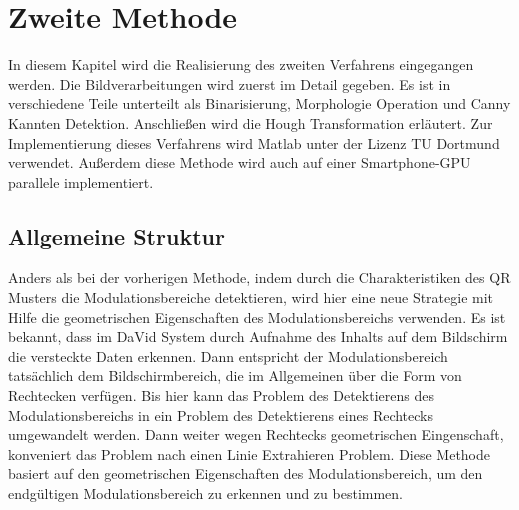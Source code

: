 \chapter{Zweite Methode} \label{cha:ZweiteMethode}

In diesem Kapitel wird die Realisierung des zweiten Verfahrens eingegangen werden. Die Bildverarbeitungen wird zuerst im Detail gegeben. Es ist in verschiedene Teile unterteilt als Binarisierung, Morphologie Operation und Canny Kannten Detektion. Anschließen wird die Hough Transformation erläutert. Zur Implementierung dieses Verfahrens wird Matlab unter der Lizenz TU Dortmund verwendet. Außerdem diese Methode wird auch auf einer Smartphone-GPU parallele implementiert.

\section{Allgemeine Struktur} 

Anders als bei der vorherigen Methode, indem durch die  Charakteristiken des QR Musters die Modulationsbereiche detektieren, wird hier eine neue Strategie mit Hilfe die geometrischen Eigenschaften des Modulationsbereichs verwenden. 
Es ist bekannt, dass im DaVid System durch Aufnahme des Inhalts auf dem Bildschirm die versteckte Daten erkennen. Dann entspricht der Modulationsbereich tatsächlich dem Bildschirmbereich, die im Allgemeinen über die Form von Rechtecken verfügen. Bis hier kann das Problem des Detektierens des Modulationsbereichs in ein Problem des Detektierens eines Rechtecks umgewandelt werden. Dann weiter wegen Rechtecks geometrischen Eingenschaft, konveniert das Problem nach einen Linie Extrahieren Problem. Diese Methode basiert auf den geometrischen Eigenschaften des Modulationsbereich, um den endgültigen Modulationsbereich zu erkennen und zu bestimmen.

